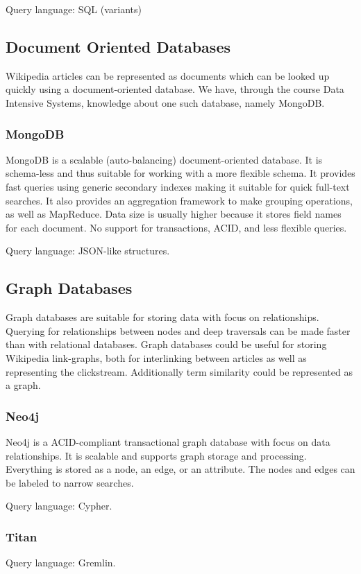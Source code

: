 Query language: SQL (variants)

\subsection{Document Oriented Databases}
Wikipedia articles can be represented as documents which can be looked up quickly using a document-oriented database. We have, through the course Data Intensive Systems, knowledge about one such database, namely MongoDB\@.

\subsubsection{MongoDB}
MongoDB is a scalable (auto-balancing) document-oriented database. It is schema-less and thus suitable for working with a more flexible schema.
It provides fast queries using generic secondary indexes making it suitable for quick full-text searches. It also provides an aggregation framework to make grouping operations, as well as MapReduce.
Data size is usually higher because it stores field names for each document. No support for transactions, ACID, and less flexible queries. 

Query language: JSON-like structures.

\subsection{Graph Databases}
Graph databases are suitable for storing data with focus on relationships. Querying for relationships between nodes and deep traversals can be made faster than with relational databases.
Graph databases could be useful for storing Wikipedia link-graphs, both for interlinking between articles as well as representing the clickstream. Additionally term similarity could be represented as a graph.

\subsubsection{Neo4j}
Neo4j is a ACID-compliant transactional graph database with focus on data relationships. It is scalable and supports graph storage and processing. Everything is stored as a node, an edge, or an attribute. The nodes and edges can be labeled to narrow searches.

Query language: Cypher.

\subsubsection{Titan}
Query language: Gremlin.

